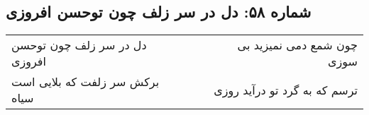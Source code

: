 \begin{center}
\section*{شماره ۵۸: دل در سر زلف چون توحسن افروزی}
\label{sec:058}
\begin{longtable}{l p{0.5cm} r}
دل در سر زلف چون توحسن افروزی
&&
چون شمع دمی نمیزید بی سوزی
\\
برکش سر زلفت که بلایی است سیاه
&&
ترسم که به گرد تو درآید روزی
\\
\end{longtable}
\end{center}
